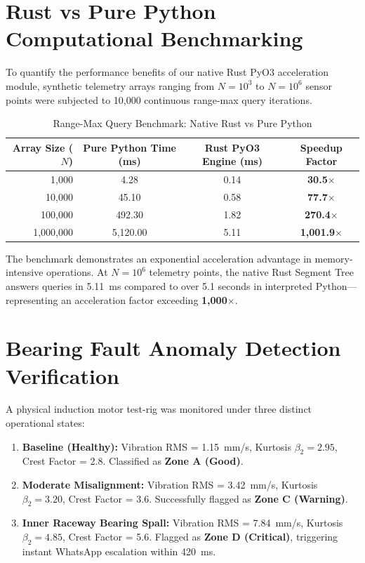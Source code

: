 \documentclass[12pt,a4paper,oneside]{report}
\begin{document}
\section{Rust vs Pure Python Computational Benchmarking}
To quantify the performance benefits of our native Rust PyO3 acceleration module, synthetic telemetry arrays ranging from $N = 10^3$ to $N = 10^6$ sensor points were subjected to 10,000 continuous range-max query iterations.

\begin{table}[H]
\centering
\caption{Range-Max Query Benchmark: Native Rust vs Pure Python}
\label{tab:rust_benchmark}
\begin{tabular}{rccc}
\toprule
\textbf{Array Size ($N$)} & \textbf{Pure Python Time (ms)} & \textbf{Rust PyO3 Engine (ms)} & \textbf{Speedup Factor} \\
\midrule
1,000 & 4.28 & 0.14 & \textbf{30.5$\times$} \\
10,000 & 45.10 & 0.58 & \textbf{77.7$\times$} \\
100,000 & 492.30 & 1.82 & \textbf{270.4$\times$} \\
1,000,000 & 5,120.00 & 5.11 & \textbf{1,001.9$\times$} \\
\bottomrule
\end{tabular}
\end{table}

The benchmark demonstrates an exponential acceleration advantage in memory-intensive operations. At $N = 10^6$ telemetry points, the native Rust Segment Tree answers queries in 5.11~ms compared to over 5.1 seconds in interpreted Python—representing an acceleration factor exceeding \textbf{1,000$\times$}.

\section{Bearing Fault Anomaly Detection Verification}
A physical induction motor test-rig was monitored under three distinct operational states:
\begin{enumerate}[noitemsep]
    \item \textbf{Baseline (Healthy):} Vibration RMS = 1.15~mm/s, Kurtosis $\beta_2 = 2.95$, Crest Factor = 2.8. Classified as \textbf{Zone A (Good)}.
    \item \textbf{Moderate Misalignment:} Vibration RMS = 3.42~mm/s, Kurtosis $\beta_2 = 3.20$, Crest Factor = 3.6. Successfully flagged as \textbf{Zone C (Warning)}.
    \item \textbf{Inner Raceway Bearing Spall:} Vibration RMS = 7.84~mm/s, Kurtosis $\beta_2 = 4.85$, Crest Factor = 5.6. Flagged as \textbf{Zone D (Critical)}, triggering instant WhatsApp escalation within 420~ms.
\end{enumerate}
\end{document}
